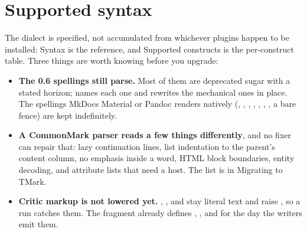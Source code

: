 \documentclass[a4paper,twoside]{article}
\begin{document}
\section{Supported syntax}
The dialect is specified, not accumulated from whichever plugins happen to be
installed: Syntax is the reference, and
Supported constructs is the per-construct table.
Three things are worth knowing before you upgrade:
\begin{itemize}
\item \textbf{The 0.6 spellings still parse.} Most of them are deprecated sugar with a
stated horizon;  names each one and  rewrites
the mechanical ones in place. The spellings MkDocs Material or Pandoc renders
natively (, , , , ,
, , a bare  fence) are kept
indefinitely.
\item \textbf{A CommonMark parser reads a few things differently}, and no fixer can
repair that: lazy continuation lines, list indentation to the parent's
content column, no emphasis inside a word, HTML block boundaries, entity
decoding, and attribute lists that need a host. The list is in
Migrating to TMark.
\item \textbf{Critic markup is not lowered yet.} , ,
 and  stay literal text and raise
, so a  run catches them. The 
fragment already defines , ,  and  for
the day the writers emit them.
\end{itemize}
\end{document}
